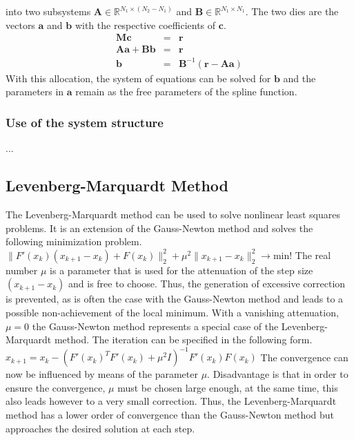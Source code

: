 \documentclass[letterpaper,10pt,english]{sphinxmanual}
\begin{document}
into two subsystems \(\boldsymbol{A}\in \mathbb{R}^{N_1 \times (N_2 - N_1)}\) and \(\boldsymbol{B}\in \mathbb{R}^{N_1 \times N_1}\).
The two dies are the vectors \(\boldsymbol{a}\) and \(\boldsymbol{b}\) with the respective coefficients of \(\boldsymbol{c}\).
\begin{eqnarray*}
   \boldsymbol{M} \boldsymbol{c} & = & \boldsymbol{r} \\
   \boldsymbol{A} \boldsymbol{a} + \boldsymbol{B} \boldsymbol{b} & = & \boldsymbol{r} \\
   \boldsymbol{b} & = & \boldsymbol{B}^{-1} (\boldsymbol{r} - \boldsymbol{A} \boldsymbol{a})
\end{eqnarray*}
With this allocation, the system of equations can be solved for \(\boldsymbol{b}\) and the parameters in \(\boldsymbol{a}\)
remain as the free parameters of the spline function.


\subsubsection{Use of the system structure}
\label{guide/background:system-structure}\label{guide/background:use-of-the-system-structure}
...


\subsection{Levenberg-Marquardt Method}
\label{guide/background:levenberg-marquardt}\label{guide/background:levenberg-marquardt-method}
The Levenberg-Marquardt method can be used to solve nonlinear least squares problems. It is an extension of the Gauss-Newton method and
solves the following minimization problem.
$\| F'(x_k)(x_{k+1} - x_k) + F(x_k) \|_2^2 + \mu^2 \|x_{k+1} - x_k \|_2^2 \rightarrow \text{min!}$
The real number \(\mu\) is a parameter that is used for the attenuation of the step size \((x_{k+1} - x_k)\) and is free to choose.
Thus, the generation of excessive correction is prevented, as is often the case with the Gauss-Newton method and leads to a possible
non-achievement of the local minimum. With a vanishing attenuation, \(\mu = 0\) the Gauss-Newton method represents a special case
of the Levenberg-Marquardt method. The iteration can be specified in the following form.
$ x_{k+1} = x_k - (F'(x_k)^T F'(x_k) + \mu^2 I)^{-1} F'(x_k) F(x_k) $
The convergence can now be influenced by means of the parameter \(\mu\). Disadvantage is that in order to ensure the convergence,
\(\mu\) must be chosen large enough, at the same time, this also leads however to a very small correction. Thus, the Levenberg-Marquardt
method has a lower order of convergence than the Gauss-Newton method but approaches the desired solution at each step.
\end{document}
